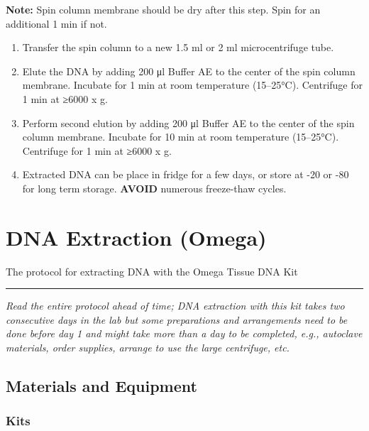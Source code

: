 \documentclass[
  letterpaper,
  DIV=11,
  numbers=noendperiod]{scrreprt}
\begin{document}
\textbf{Note:} Spin column membrane should be dry after this step. Spin
for an additional 1 min if not.

\begin{enumerate}
\def\labelenumi{\arabic{enumi}.}
\item
  Transfer the spin column to a new 1.5 ml or 2 ml microcentrifuge tube.
\item
  Elute the DNA by adding 200 μl Buffer AE to the center of the spin
  column membrane. Incubate for 1 min at room temperature (15--25°C).
  Centrifuge for 1 min at ≥6000 x g.
\item
  Perform second elution by adding 200 μl Buffer AE to the center of the
  spin column membrane. Incubate for 10 min at room temperature
  (15--25°C). Centrifuge for 1 min at ≥6000 x g.
\item
  Extracted DNA can be place in fridge for a few days, or store at -20
  or -80 for long term storage. \textbf{AVOID} numerous freeze-thaw
  cycles.\\
\end{enumerate}

\hypertarget{dna-extraction-omega}{%
\chapter{DNA Extraction (Omega)}\label{dna-extraction-omega}}

The protocol for extracting DNA with the Omega Tissue DNA Kit

\begin{center}\rule{0.5\linewidth}{0.5pt}\end{center}

\emph{Read the entire protocol ahead of time; DNA extraction with this
kit takes two consecutive days in the lab but some preparations and
arrangements need to be done before day 1 and might take more than a day
to be completed, e.g., autoclave materials, order supplies, arrange to
use the large centrifuge, etc.}

\hypertarget{materials-and-equipment-1}{%
\section*{\texorpdfstring{\textbf{Materials and
Equipment}}{Materials and Equipment}}\label{materials-and-equipment-1}}


\hypertarget{kits}{%
\subsection*{\texorpdfstring{\textbf{Kits}}{Kits}}\label{kits}}
\end{document}
